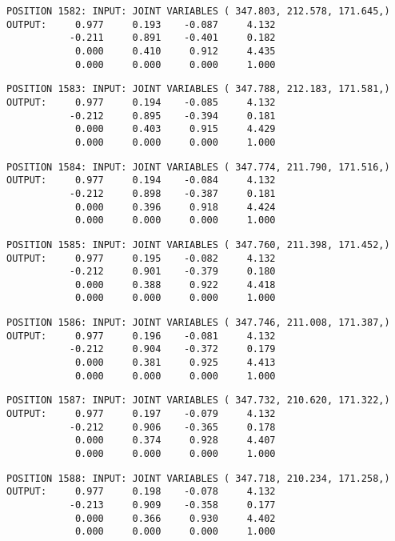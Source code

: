 \begin{verbatim}
POSITION 1582: INPUT: JOINT VARIABLES ( 347.803, 212.578, 171.645,)
OUTPUT:     0.977     0.193    -0.087     4.132
           -0.211     0.891    -0.401     0.182
            0.000     0.410     0.912     4.435
            0.000     0.000     0.000     1.000
\end{verbatim} \pagebreak[1]\begin{verbatim}
POSITION 1583: INPUT: JOINT VARIABLES ( 347.788, 212.183, 171.581,)
OUTPUT:     0.977     0.194    -0.085     4.132
           -0.212     0.895    -0.394     0.181
            0.000     0.403     0.915     4.429
            0.000     0.000     0.000     1.000
\end{verbatim} \pagebreak[1]\begin{verbatim}
POSITION 1584: INPUT: JOINT VARIABLES ( 347.774, 211.790, 171.516,)
OUTPUT:     0.977     0.194    -0.084     4.132
           -0.212     0.898    -0.387     0.181
            0.000     0.396     0.918     4.424
            0.000     0.000     0.000     1.000
\end{verbatim} \pagebreak[1]\begin{verbatim}
POSITION 1585: INPUT: JOINT VARIABLES ( 347.760, 211.398, 171.452,)
OUTPUT:     0.977     0.195    -0.082     4.132
           -0.212     0.901    -0.379     0.180
            0.000     0.388     0.922     4.418
            0.000     0.000     0.000     1.000
\end{verbatim} \pagebreak[1]\begin{verbatim}
POSITION 1586: INPUT: JOINT VARIABLES ( 347.746, 211.008, 171.387,)
OUTPUT:     0.977     0.196    -0.081     4.132
           -0.212     0.904    -0.372     0.179
            0.000     0.381     0.925     4.413
            0.000     0.000     0.000     1.000
\end{verbatim} \pagebreak[1]\begin{verbatim}
POSITION 1587: INPUT: JOINT VARIABLES ( 347.732, 210.620, 171.322,)
OUTPUT:     0.977     0.197    -0.079     4.132
           -0.212     0.906    -0.365     0.178
            0.000     0.374     0.928     4.407
            0.000     0.000     0.000     1.000
\end{verbatim} \pagebreak[1]\begin{verbatim}
POSITION 1588: INPUT: JOINT VARIABLES ( 347.718, 210.234, 171.258,)
OUTPUT:     0.977     0.198    -0.078     4.132
           -0.213     0.909    -0.358     0.177
            0.000     0.366     0.930     4.402
            0.000     0.000     0.000     1.000
\end{verbatim} \pagebreak[1]\begin{verbatim}

\end{verbatim}
